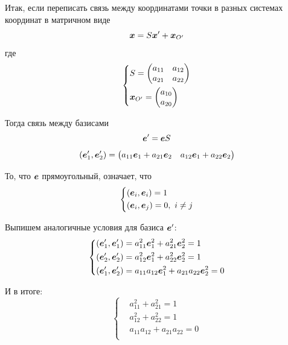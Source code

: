 \documentclass[a4paper,12pt]{article}
\begin{document}
  \begin{solution}
    Итак, если переписать связь между координатами точки в разных системах координат в матричном виде
    \[
      \boldsymbol x = S \boldsymbol x' + \boldsymbol x_{O'}
    \]
    где
    \[
      \left\{
        \begin{aligned}
          &S = \begin{pmatrix}
              a_{11} & a_{12}\\
              a_{21} & a_{22}
            \end{pmatrix}\\
          &\boldsymbol x_{O'} = \begin{pmatrix}
              a_{10}\\ a_{20}
            \end{pmatrix}
        \end{aligned}
      \right.
    \]
    
    Тогда связь между базисами
    \[
      \boldsymbol e' = \boldsymbol e S
    \]
    \[
      (\boldsymbol e_1', \boldsymbol e_2') = \begin{pmatrix}
        a_{11} \boldsymbol e_1 + a_{21} \boldsymbol e_2
        & a_{12} \boldsymbol e_1 + a_{22} \boldsymbol e_2
      \end{pmatrix}
    \]
    
    То, что $\boldsymbol e$ прямоугольный, означает, что
    \[
      \left\{
        \begin{aligned}
          &(\boldsymbol e_i, \boldsymbol e_i) = 1\\
          &(\boldsymbol e_i, \boldsymbol e_j) = 0,\ i \not= j
        \end{aligned}
      \right.
    \]
    
    Выпишем аналогичные условия для базиса $\boldsymbol e'$:
    \[
      \left\{
        \begin{aligned}
          &(\boldsymbol e_1', \boldsymbol e_1') = a_{11}^2 \boldsymbol e_1^2 + a_{21}^2 \boldsymbol e_2^2 = 1\\
          &(\boldsymbol e_2', \boldsymbol e_2') = a_{12}^2 \boldsymbol e_1^2 + a_{22}^2 \boldsymbol e_2^2 = 1\\
          &(\boldsymbol e_1', \boldsymbol e_2') = a_{11} a_{12} \boldsymbol e_1^2 + a_{21} a_{22} \boldsymbol e_2^2 = 0
        \end{aligned}
      \right.
    \]
    
    И в итоге:
    \[
      \left\{
        \begin{aligned}
          &a_{11}^2 + a_{21}^2 = 1\\
          &a_{12}^2 + a_{22}^2 = 1\\
          &a_{11} a_{12} + a_{21} a_{22} = 0\\
        \end{aligned}
      \right.
    \]
    

\end{solution}
\end{document}

